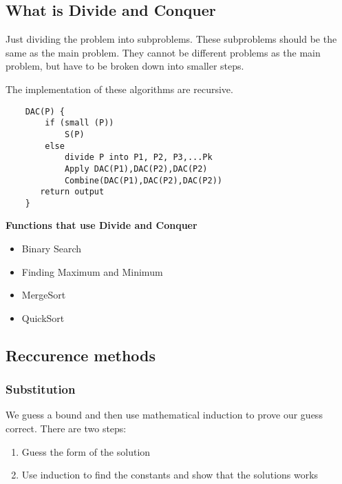 \subsection{What is Divide and Conquer}
Just dividing the problem into subproblems. These subproblems should be the same as the main problem. They cannot be different problems as the main problem, but have to be broken down into smaller steps.   

The implementation of these algorithms are recursive.   

\begin{lstlisting}
    DAC(P) {
        if (small (P))
            S(P)
        else
            divide P into P1, P2, P3,...Pk
            Apply DAC(P1),DAC(P2),DAC(P2)
            Combine(DAC(P1),DAC(P2),DAC(P2)) 
       return output 
    }
\end{lstlisting}
\vspace{5mm}
 
\textbf{Functions that use Divide and Conquer}
\begin{itemize}
    \item Binary Search
    \item Finding Maximum and Minimum
    \item MergeSort
    \item QuickSort 
\end{itemize}

\subsection{Reccurence methods}

\subsubsection{Substitution}
We guess a bound and then use mathematical induction to prove our guess correct.
There are two steps:
\begin{enumerate}
    \item Guess the form of the solution
    \item Use induction to find the constants and show that the solutions works
\end{enumerate}

